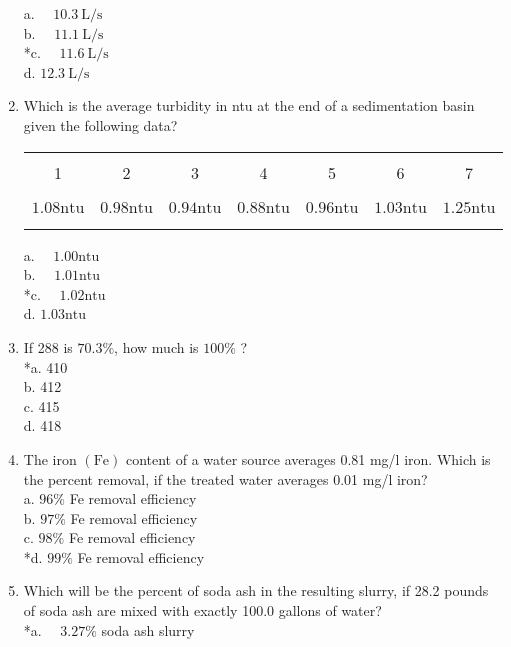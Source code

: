 \begin{enumerate}
a. $\quad 10.3 \mathrm{~L} / \mathrm{s}$\\
b. $\quad 11.1 \mathrm{~L} / \mathrm{s}$\\
*c. $\quad 11.6 \mathrm{~L} / \mathrm{s}$\\
d. $12.3 \mathrm{~L} / \mathrm{s}$
\item Which is the average turbidity in ntu at the end of a sedimentation basin given the following data?\\
\begin{center}
\begin{tabular}{|c|c|c|c|c|c|c|}
\hline\\
1 & 2 & 3 & 4 & 5 & 6 & 7 \\\\
\hline\\
$1.08 \mathrm{ntu}$ & $0.98 \mathrm{ntu}$ & $0.94 \mathrm{ntu}$ & $0.88 \mathrm{ntu}$ & $0.96 \mathrm{ntu}$ & $1.03 \mathrm{ntu}$ & $1.25 \mathrm{ntu}$ \\\\
\hline\\
\end{tabular}
\end{center}
a. $\quad 1.00 \mathrm{ntu}$\\
b. $\quad 1.01 \mathrm{ntu}$\\
*c. $\quad 1.02 \mathrm{ntu}$\\
d. $1.03 \mathrm{ntu}$\\
\item If 288 is $70.3 \%$, how much is $100 \%$ ?\\
*a. 410\\
b. 412\\
c. 415\\
d. 418\\
\item The iron $(\mathrm{Fe})$ content of a water source averages 0.81 mg/l iron. Which is the percent removal, if the treated water averages 0.01 mg/l iron?\\
a. $96 \%$ Fe removal efficiency\\
b. $97 \%$ Fe removal efficiency\\
c. $98 \%$ Fe removal efficiency\\
*d. $99 \%$ Fe removal efficiency\\
\item Which will be the percent of soda ash in the resulting slurry, if 28.2 pounds of soda ash are mixed with exactly 100.0 gallons of water?\\
*a. $\quad 3.27 \%$ soda ash slurry\\

\end{enumerate}
